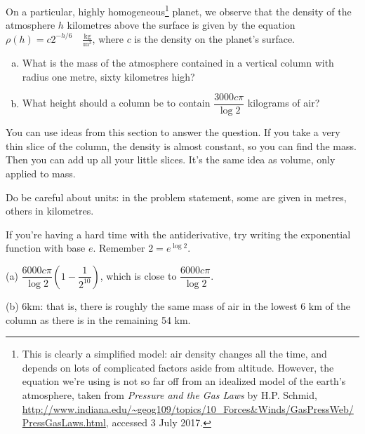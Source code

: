 \begin{Mquestion}\label{prob_s1.6:density}

On a particular, highly homogeneous\footnote{This is clearly a simplified model: air density changes all the time, and depends on lots of complicated factors aside from altitude. However, the equation we're using is not so far off from an idealized model of the earth's atmosphere, taken from \emph{Pressure and the Gas Laws} by H.P. Schmid, \url{http://www.indiana.edu/~geog109/topics/10_Forces&Winds/GasPressWeb/PressGasLaws.html}, accessed 3 July 2017.} planet, we observe that the density of the atmosphere $h$ kilometres above the surface is given by the equation $\rho(h) = c2^{-h/6}\quad \frac{\mathrm{kg}}{\mathrm{m^3}}$, where $c$ is the density on the planet's surface.
\begin{enumerate}[(a)]
\item What is the mass of the atmosphere contained in a vertical column with radius one metre,  sixty kilometres high?
\item What height should a column be to contain $\dfrac{3000c\pi}{\log 2}$ kilograms of air?
\end{enumerate}
\end{Mquestion}
\begin{hint}
You can use ideas from this section to answer the question. If you take a very thin slice of the column, the density is almost constant, so you can find the mass. Then you can add up all your little slices. It's the same idea as volume, only applied to mass.

Do be careful about units: in the problem statement, some are given in metres, others in kilometres.

If you're having a hard time with the antiderivative, try writing the exponential function with base $e$. Remember $2 = e^{\log 2}$.
\end{hint}
\begin{answer}
(a) $\dfrac{6000c\pi}{\log 2}\left(1-\dfrac{1}{2^{10}}\right)$, which is close to
$\dfrac{6000c\pi}{\log 2}$.

(b) 6km: that is, there is roughly the same mass of air in the lowest 6 km of the column as there is in the remaining 54 km.
\end{answer}
